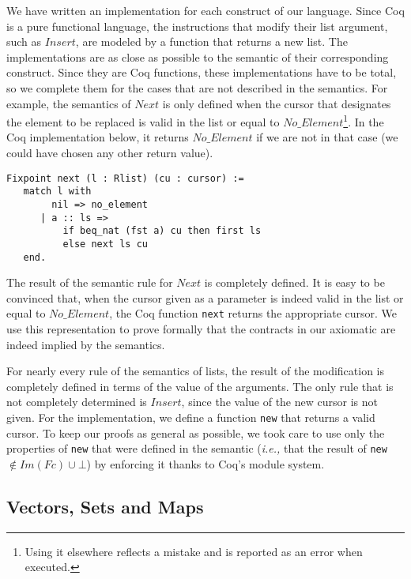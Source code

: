 \documentclass[runningheads,a4paper]{llncs}
\newcommand{\ie}{\textit{i.e.,}\xspace}
\newcommand{\Fc}{\ensuremath{\mathit{Fc}}\xspace}
\newcommand{\ImFc}{\ensuremath{\mathit{Im}(\Fc)}\xspace}
\newcommand{\Insert}{\ensuremath{\mathit{Insert}}\xspace}
\newcommand{\Next}{\ensuremath{\mathit{Next}}\xspace}
\newcommand{\NoElement}{\ensuremath{\mathit{No\_Element}}\xspace}
\newcommand{\beforesub}{\vspace{-0.2cm}}
\newcommand{\aftersub}{\vspace{-0.1cm}}
\begin{document}
We have written an implementation for each construct of our language. Since Coq
is a pure functional language, the instructions that modify their list
argument, such as \Insert, are modeled by a function that returns a new list.
The implementations are as close as possible to the semantic of their
corresponding construct. Since they are Coq functions, these implementations
have to be total, so we complete them for the cases that are not described in
the semantics. For example, the semantics of \Next is only defined when the
cursor that designates the element to be replaced is valid in the list or equal
to \NoElement\footnote{Using it elsewhere reflects a mistake and is reported as
an error when executed.}. In the Coq implementation below, it returns \NoElement if we are
not in that case (we could have chosen any other return value).
\begin{lstlisting}
Fixpoint next (l : Rlist) (cu : cursor) :=
   match l with
        nil => no_element
      | a :: ls =>
          if beq_nat (fst a) cu then first ls
          else next ls cu
   end.
\end{lstlisting}
The result of the semantic rule for $\Next$ is completely defined. It is easy
to be convinced that, when the cursor given as a parameter is indeed valid in
the list or equal to $\NoElement$, the Coq function \texttt{next}
returns the appropriate cursor. We use this representation to prove formally
that the contracts in our axiomatic are indeed implied by the semantics.

For nearly every rule of the semantics of lists, the result of the modification
is completely defined in terms of the value of the arguments. The only rule
that is not completely determined is $\Insert$, since the value of the new
cursor is not given. For the implementation, we define a function \texttt{new}
that returns a valid cursor. To keep our proofs as general as possible, we
took care to use only the properties of \texttt{new} that were defined in the
semantic (\ie that the result of \texttt{new} $\notin \ImFc\cup \bot$) by
enforcing it thanks to Coq's module system.

\beforesub
\subsection{Vectors, Sets and Maps}
\aftersub
\end{document}
